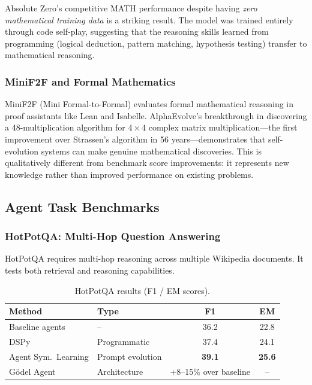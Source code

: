 Absolute Zero's competitive MATH performance despite having \emph{zero mathematical training data} is a striking result. The model was trained entirely through code self-play, suggesting that the reasoning skills learned from programming (logical deduction, pattern matching, hypothesis testing) transfer to mathematical reasoning.

\subsubsection{MiniF2F and Formal Mathematics}

MiniF2F (Mini Formal-to-Formal) evaluates formal mathematical reasoning in proof assistants like Lean and Isabelle. AlphaEvolve's breakthrough in discovering a 48-multiplication algorithm for $4\times4$ complex matrix multiplication---the first improvement over Strassen's algorithm in 56 years---demonstrates that self-evolution systems can make genuine mathematical discoveries. This is qualitatively different from benchmark score improvements: it represents new knowledge rather than improved performance on existing problems.

\subsection{Agent Task Benchmarks}\label{sec:ch5-agent}

\subsubsection{HotPotQA: Multi-Hop Question Answering}

HotPotQA requires multi-hop reasoning across multiple Wikipedia documents. It tests both retrieval and reasoning capabilities.

\begin{table}[htbp]
\centering
\caption{HotPotQA results (F1 / EM scores).}
\label{tab:hotpotqa-results}
\begin{tabular}{llcc}
\toprule
\textbf{Method} & \textbf{Type} & \textbf{F1} & \textbf{EM} \\
\midrule
Baseline agents & -- & 36.2 & 22.8 \\
DSPy & Programmatic & 37.4 & 24.1 \\
Agent Sym.\ Learning & Prompt evolution & \textbf{39.1} & \textbf{25.6} \\
G\"{o}del Agent & Architecture & +8--15\% over baseline & -- \\
\bottomrule
\end{tabular}
\end{table}

